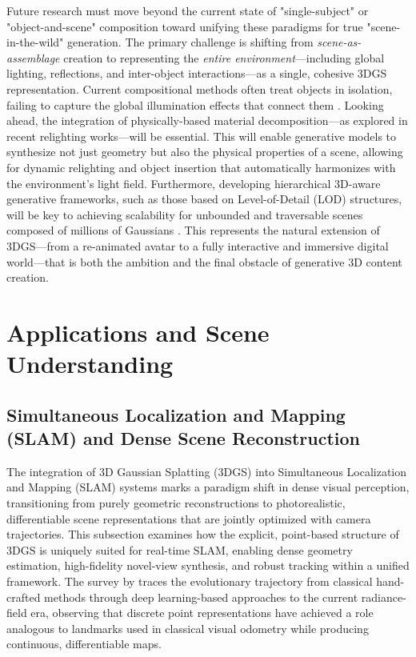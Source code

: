 \documentclass[11pt,a4paper]{article}
\begin{document}
Future research must move beyond the current state of "single-subject" or "object-and-scene" composition toward unifying these paradigms for true "scene-in-the-wild" generation. The primary challenge is shifting from \emph{scene-as-assemblage} creation to representing the \emph{entire environment}---including global lighting, reflections, and inter-object interactions---as a single, cohesive 3DGS representation. Current compositional methods often treat objects in isolation, failing to capture the global illumination effects that connect them \cite{arxiv:1704.00112v3}. Looking ahead, the integration of physically-based material decomposition---as explored in recent relighting works---will be essential. This will enable generative models to synthesize not just geometry but also the physical properties of a scene, allowing for dynamic relighting and object insertion that automatically harmonizes with the environment's light field. Furthermore, developing hierarchical 3D-aware generative frameworks, such as those based on Level-of-Detail (LOD) structures, will be key to achieving scalability for unbounded and traversable scenes composed of millions of Gaussians \cite{arxiv:2401.03890v2,arxiv:2406.12080v1}. This represents the natural extension of 3DGS---from a re-animated avatar to a fully interactive and immersive digital world---that is both the ambition and the final obstacle of generative 3D content creation.


\section{Applications and Scene Understanding}



\subsection{Simultaneous Localization and Mapping (SLAM) and Dense Scene Reconstruction}


The integration of 3D Gaussian Splatting (3DGS) into Simultaneous Localization and Mapping (SLAM) systems marks a paradigm shift in dense visual perception, transitioning from purely geometric reconstructions to photorealistic, differentiable scene representations that are jointly optimized with camera trajectories. This subsection examines how the explicit, point-based structure of 3DGS is uniquely suited for real-time SLAM, enabling dense geometry estimation, high-fidelity novel-view synthesis, and robust tracking within a unified framework. The survey by \cite{arxiv:2402.13255v2} traces the evolutionary trajectory from classical hand-crafted methods through deep learning-based approaches to the current radiance-field era, observing that discrete point representations have achieved a role analogous to landmarks used in classical visual odometry while producing continuous, differentiable maps.
\end{document}

